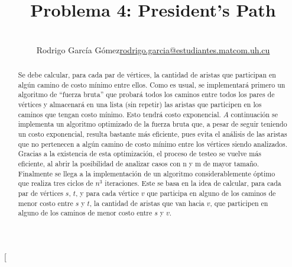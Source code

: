 \documentclass[a4paper,12pt,twocolumn]{article}
\title{Problema 4: President's Path}
\author{\\
\name Rodrigo García Gómez\email \href{mailto:rodrigo.garcia@estudiantes.matcom.uh.cu}{rodrigo.garcia@estudiantes.matcom.uh.cu}
}
\begin{document}

\twocolumn[
\maketitle


\begin{abstract}
Se debe calcular, para cada par de vértices, la cantidad de aristas que participan en algún camino de costo mínimo entre ellos. Como es usual, se implementará primero un algoritmo de “fuerza bruta” que probará todos los caminos entre todos los pares de vértices y almacenará en una lista (sin repetir) las aristas que participen en los caminos que tengan costo mínimo. Esto tendrá costo exponencial. $A$ continuación se implementa un algoritmo optimizado de la fuerza bruta que, a pesar de seguir teniendo un costo exponencial, resulta bastante más eficiente, pues evita el análisis de las aristas que no pertenecen a algún camino de costo mínimo entre los vértices siendo analizados. Gracias a la existencia de esta optimización, el proceso de testeo se vuelve más eficiente, al abrir la posibilidad de analizar casos con n y m de mayor tamaño.\\
Finalmente se llega a la implementación de un algoritmo considerablemente óptimo que realiza tres ciclos de $n^3$ iteraciones. Este se basa en la idea de calcular, para cada par de vértices $s$, $t$, y para cada vértice $v$ que participa en alguno de los caminos de menor costo entre $s$ y $t$, la cantidad de aristas que van hacia $v$, que participen en alguno de los caminos de menor costo entre $s$ y $v$.\\
\end{abstract}

\vspace{0.5cm}
\end{document}
